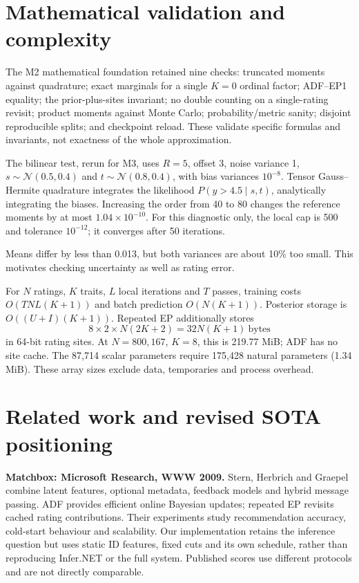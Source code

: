 \documentclass[12pt,a4paper]{article}
\newcommand{\N}{\mathcal N}
\begin{document}


\section{Mathematical validation and complexity}
The M2 mathematical foundation retained nine checks: truncated moments against quadrature; exact marginals for a
single $K=0$ ordinal factor; ADF--EP1 equality; the prior-plus-sites invariant;
no double counting on a single-rating revisit; product moments against Monte
Carlo; probability/metric sanity; disjoint reproducible splits; and checkpoint
reload. These validate specific formulas and invariants, not exactness of the
whole approximation.

The bilinear test, rerun for M3, uses $R=5$, offset 3, noise variance 1,
$s\sim\N(0.5,0.4)$ and $t\sim\N(0.8,0.4)$, with bias variances $10^{-8}$.
Tensor Gauss--Hermite quadrature integrates the likelihood
$P(y>4.5\mid s,t)$, analytically integrating the biases. Increasing the order
from 40 to 80 changes the reference moments by at most $1.04\times10^{-10}$.
For this diagnostic only, the local cap is 500 and tolerance $10^{-12}$;
it converges after 50 iterations.

\begin{table}[!htbp]\centering\small

\caption{One-observation validation against 80-point-per-axis quadrature.
The hybrid approximation cannot retain the nonzero posterior covariance.}
\end{table}
Means differ by less than 0.013, but both variances are about 10\% too small.
This motivates checking uncertainty as well as rating error.

For $N$ ratings, $K$ traits, $L$ local iterations and $T$ passes, training costs
$O(TNL(K+1))$ and batch prediction $O(N(K+1))$. Posterior storage is
$O((U+I)(K+1))$. Repeated EP additionally stores
\begin{equation}
8\times2\times N(2K+2)=32N(K+1)\ \text{bytes}
\end{equation}
in 64-bit rating sites. At $N=800{,}167$, $K=8$, this is 219.77 MiB; ADF has no
site cache. The 87,714 scalar parameters require 175,428 natural parameters
(1.34 MiB). These array sizes exclude data, temporaries and process overhead.





\section{Related work and revised SOTA positioning}
\textbf{Matchbox: Microsoft Research, WWW 2009.} Stern, Herbrich and
Graepel~\cite{stern2009} combine latent features, optional metadata, feedback
models and hybrid message passing. ADF provides efficient online Bayesian
updates; repeated EP revisits cached rating contributions. Their experiments
study recommendation accuracy, cold-start behaviour and scalability. Our
implementation retains the inference question but uses static ID features,
fixed cuts and its own schedule, rather than reproducing Infer.NET or the full
system. Published scores use different protocols and are not directly comparable.
\end{document}
